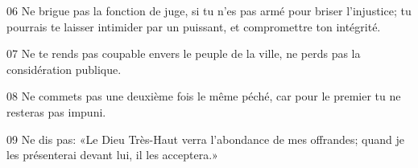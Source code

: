 
06 Ne brigue pas la fonction de juge, si tu n’es pas armé pour briser l’injustice; tu pourrais te laisser intimider par un puissant, et compromettre ton intégrité.

07 Ne te rends pas coupable envers le peuple de la ville, ne perds pas la considération publique.

08 Ne commets pas une deuxième fois le même péché, car pour le premier tu ne resteras pas impuni.

09 Ne dis pas: «Le Dieu Très-Haut verra l’abondance de mes offrandes; quand je les présenterai devant lui, il les acceptera.»
